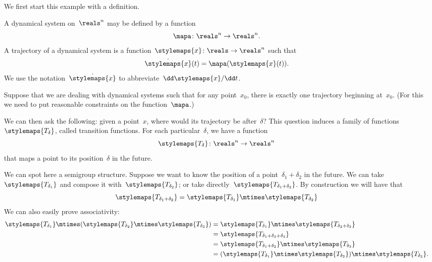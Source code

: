 \begin{example}
    We first start this example with a definition.
    \label{exa:transition-functions}
    \begin{definition}
        \label{def:ct-dynsyst}
        A dynamical system on~$\reals^n$ may be defined by a function
        \begin{equation}
            \mapa \colon \reals^n \to \reals^n.
        \end{equation}
        A trajectory of a dynamical system is a function~$\stylemaps{x}\colon \reals \to \reals^n$ such that
        \begin{equation}
            \dot{\stylemaps{x}}(t) = \mapa(\stylemaps{x}(t)).
        \end{equation}
        We use the notation~$\dot{\stylemaps{x}}$ to abbreviate~$\dd \stylemaps{x} / \dd t$.
    \end{definition}
    
    Suppose that we are dealing with dynamical systems such that for any point~$x_0$, there is exactly one trajectory beginning at~$x_0$. (For this we need to put reasonable constraints on the function~$\mapa$.)
    
    We can then ask the following: given a point~$x$, where would its trajectory be after~$\delta$?
    This question induces a family of functions~$\stylemaps{T_\delta}$, called transition functions.
    For each particular~$\delta$, we have a function
    \begin{equation*}
        \stylemaps{T_{\delta}}\colon \reals^n \to  \reals^n
    \end{equation*}
    that maps a point to its position~$\delta$ in the future.
    
    We can spot here a semigroup structure.
    Suppose we want to know the position of a point~$\delta_1 + \delta_2$
    in the future.
    We can take~$\stylemaps{T_{\delta_1}}$ and compose it with~$\stylemaps{T_{\delta_2}}$; or take directly~$\stylemaps{T_{\delta_1 + \delta_2}}$.
    By construction we will have that
    \begin{equation}
        \label{eq:transition-property}
        \stylemaps{T_{\delta_1 + \delta_2}} = \stylemaps{T_{\delta_1}} \mtimes \stylemaps{T_{\delta_2}}
    \end{equation}
    We can also easily prove associativity:
    \begin{equation}
        \begin{aligned}
            \stylemaps{T_{\delta_1}}\mtimes (\stylemaps{T_{\delta_2}}\mtimes \stylemaps{T_{\delta_3}})&=\stylemaps{T_{\delta_1}}\mtimes \stylemaps{T_{\delta_2+\delta_3}}\\
            &=\stylemaps{T_{\delta_1+\delta_2+\delta_3}}\\
            &=\stylemaps{T_{\delta_1+\delta_2}}\mtimes \stylemaps{T_{\delta_3}}\\
            &=(\stylemaps{T_{\delta_1}}\mtimes \stylemaps{T_{\delta_2}})\mtimes \stylemaps{T_{\delta_3}}.
        \end{aligned}
    \end{equation}
    

\end{example}
